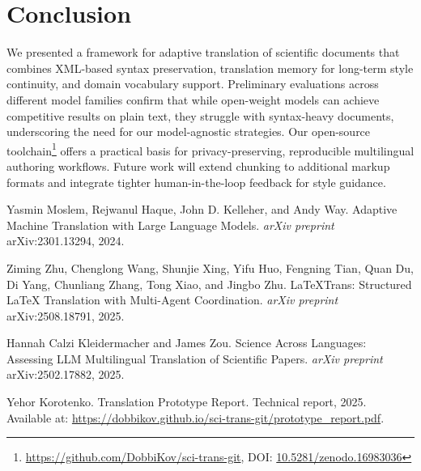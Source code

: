 \documentclass[runningheads]{llncs}
\begin{document}
\section{Conclusion}
We presented a framework for adaptive translation of scientific documents that
combines XML-based syntax preservation, translation memory for long-term style
continuity, and domain vocabulary support. Preliminary evaluations across
different model families confirm that while open-weight models can achieve
competitive results on plain text, they struggle with syntax-heavy documents,
underscoring the need for our model-agnostic strategies. Our open-source
toolchain\footnote{\url{https://github.com/DobbiKov/sci-trans-git}, DOI:
\href{https://doi.org/10.5281/zenodo.16983036}{10.5281/zenodo.16983036}} offers
a practical basis for privacy-preserving, reproducible multilingual authoring
workflows. Future work will extend chunking to additional markup formats and
integrate tighter human-in-the-loop feedback for style guidance.


%
%



\begin{thebibliography}{8}
Yasmin Moslem, Rejwanul Haque, John D. Kelleher, and Andy Way.
\newblock Adaptive Machine Translation with Large Language Models.
\newblock \emph{arXiv preprint} arXiv:2301.13294, 2024.

Ziming Zhu, Chenglong Wang, Shunjie Xing, Yifu Huo, Fengning Tian, Quan Du, Di Yang, Chunliang Zhang, Tong Xiao, and Jingbo Zhu.
\newblock LaTeXTrans: Structured LaTeX Translation with Multi-Agent Coordination.
\newblock \emph{arXiv preprint} arXiv:2508.18791, 2025.

Hannah Calzi Kleidermacher and James Zou.
\newblock Science Across Languages: Assessing LLM Multilingual Translation of Scientific Papers.
\newblock \emph{arXiv preprint} arXiv:2502.17882, 2025.

Yehor Korotenko.
\newblock Translation Prototype Report.
\newblock Technical report, 2025.
\newblock Available at: \url{https://dobbikov.github.io/sci-trans-git/prototype_report.pdf}.

\end{thebibliography}
\end{document}

